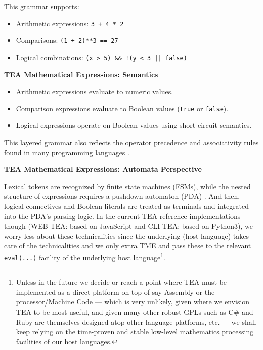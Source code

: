 \documentclass[a4paper, 18pt]{book} %
\begin{document}
{{{{This grammar supports:
\begin{itemize}
\item Arithmetic expressions: \texttt{3 + 4 * 2}
\item Comparisons: \texttt{(1 + 2)**{}3 == 27}
\item Logical combinations: \texttt{(x > 5) \&\& !(y < 3 || false)}
\end{itemize}

\vspace{1em}

\textbf{TEA Mathematical Expressions: Semantics}

\begin{itemize}
  \item Arithmetic expressions evaluate to numeric values.
  \item Comparison expressions evaluate to Boolean values (\texttt{true} or \texttt{false}).
  \item Logical expressions operate on Boolean values using short-circuit semantics.
\end{itemize}

This layered grammar also reflects the operator precedence and associativity rules found in many programming languages \cite{grune2007parsing}.

\vspace{1em}

\textbf{TEA Mathematical Expressions: Automata Perspective}

Lexical tokens are recognized by finite state machines (FSMs), while the nested structure of expressions requires a pushdown automaton (PDA) \cite{sipser2012theory}. And then, logical connectives and Boolean literals are treated as terminals and integrated into the PDA’s parsing logic. In the current TEA reference implementations though (WEB TEA: based on JavaScript and CLI TEA: based on Python3), we worry less about these technicalities since the underlying (host language) takes care of the technicalities and we only extra TME and pass these to the relevant \texttt{eval(...)} facility of the underlying host language\footnote{Unless in the future we decide or reach a point where TEA must be implemented as a direct platform on-top of say Assembly or the processor/Machine Code --- which is very unlikely, given where we envision TEA to be most useful, and given many other robust GPLs such as C\# and Ruby are themselves designed atop other language platforms, etc. --- we shall keep relying on the time-proven and stable low-level mathematics processing facilities of our host languages.}. 

}}}}
\end{document}
